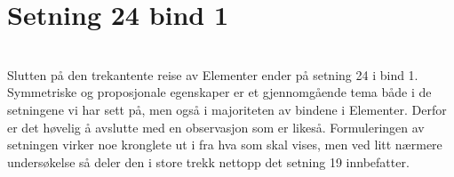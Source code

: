 \documentclass[12pt,
               a4paper,
               article,
               oneside,
               oldfontcommands,
               norsk]{memoir}
\begin{document}
\section{Setning 24 bind 1}
\vspace{4mm}\\ 
Slutten på den trekantente reise av Elementer ender på setning 24 i bind 1. Symmetriske og proposjonale egenskaper er et gjennomgående tema både i de setningene vi har sett på, men også i majoriteten av bindene i Elementer. Derfor er det høvelig å avslutte med en observasjon som er likeså. Formuleringen av setningen virker noe kronglete ut i fra hva som skal vises, men ved litt nærmere undersøkelse så deler den i store trekk nettopp det setning 19 innbefatter. \vspace{4mm}\\ 
\end{document}
